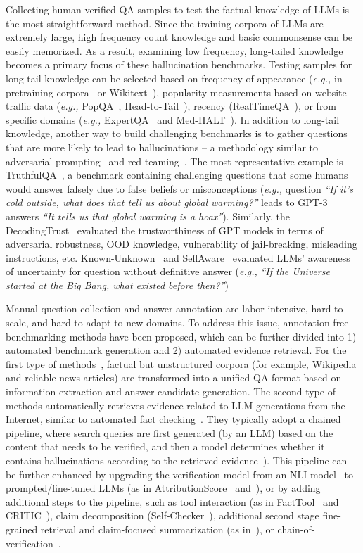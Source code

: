\label{SEC:Human-annotated Hallucination Benchmarks} 
    Collecting human-verified QA samples to test the factual knowledge of LLMs is the most straightforward method. Since the training corpora of LLMs are extremely large, high frequency count knowledge and basic commonsense can be easily memorized. As a result, examining low frequency, long-tailed knowledge becomes a primary focus of these hallucination benchmarks. Testing samples for long-tail knowledge can be selected based on frequency of appearance (\textit{e.g.,} in pretraining corpora~ or Wikitext~), popularity measurements based on website traffic data (\textit{e.g.,} PopQA~, Head-to-Tail~), recency (RealTimeQA~), or from specific domains (\textit{e.g.,} ExpertQA~ and Med-HALT~). In addition to long-tail knowledge, another way to build challenging benchmarks is to gather questions that are more likely to lead to hallucinations -- a methodology similar to adversarial prompting~ and red teaming~. The most representative example is TruthfulQA~, a benchmark containing challenging questions that some humans would answer falsely due to false beliefs or misconceptions (\textit{e.g.,} question \textit{``If it's cold outside, what does that tell us about global warming?''} leads to GPT-3 answers \textit{``It tells us that global warming is a hoax''}). 
    Similarly, the DecodingTrust~ evaluated the trustworthiness of GPT models in terms of adversarial robustness, OOD knowledge, vulnerability of jail-breaking, misleading instructions, etc.
    Known-Unknown~ and SeflAware~ evaluated LLMs' awareness of uncertainty for question without definitive answer (\textit{e.g.,} \textit{``If the Universe started at the Big Bang, what existed before then?''})

Manual question collection and answer annotation are labor intensive, hard to scale, and hard to adapt to new domains. To address this issue, annotation-free benchmarking methods have been proposed, which can be further divided into 1) automated benchmark generation and 2) automated evidence retrieval. For the first type of methods~, factual but unstructured corpora (for example, Wikipedia and reliable news articles) are transformed into a unified QA format based on information extraction and answer candidate generation. The second type of methods automatically retrieves evidence related to LLM generations from the Internet, similar to automated fact checking~. They typically adopt a chained pipeline, where search queries are first generated (by an LLM) based on the content that needs to be verified, and then a model determines whether it contains hallucinations according to the retrieved evidence~). This pipeline can be further enhanced by upgrading the verification model from an NLI model~ to prompted/fine-tuned LLMs (as in AttributionScore~ and~), or by adding additional steps to the pipeline, such as tool interaction (as in FactTool~ and CRITIC~), claim decomposition (Self-Checker~), additional second stage fine-grained retrieval and claim-focused summarization (as in~), or chain-of-verification~.

